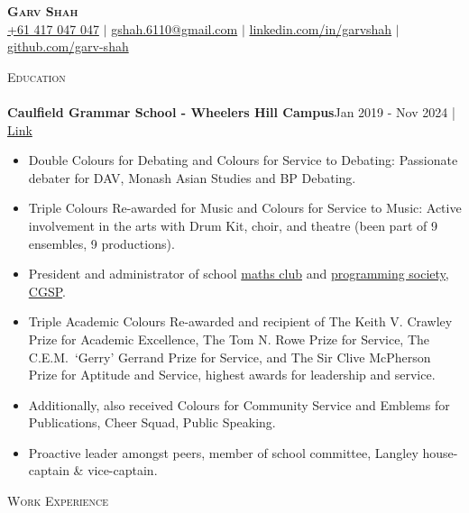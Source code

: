 \documentclass[a4paper]{article}
\newcommand{\lineunder} {
    \vspace*{-8pt} \\
    \hspace*{-18pt} \hrulefill \\
}
\newcommand{\header} [1] {
    {\hspace*{-18pt}\vspace*{6pt} \textsc{#1}}
    \vspace*{-6pt} \lineunder
}
\begin{document}
\vspace*{-40pt}



\vspace*{-20pt}

\begin{center}
    \textbf{\Huge \scshape Garv Shah} \\ \vspace{1pt}
    \small \href{tel:+61417047047}{+61 417 047 047} $|$ \href{mailto:gshah.6110@gmail.com}{gshah.6110@gmail.com} $|$
    \href{https://www.linkedin.com/in/garvshah/}{linkedin.com/in/garvshah} $|$
    \href{https://garv-shah.github.io/}{github.com/garv-shah}
\end{center}
\vspace{-2mm}

\header{Education}
\textbf{Caulfield Grammar School - Wheelers Hill Campus}\hfill Jan 2019 - Nov 2024 | \href{https://www.caulfieldgs.vic.edu.au/wheelers-hill/}{\color{blue}Link}\\
\begin{itemize} \itemsep 1pt
	\item Double Colours for Debating and Colours for Service to Debating: Passionate debater for DAV, Monash Asian Studies and BP Debating.
        \item Triple Colours Re-awarded for Music and Colours for Service to Music: Active involvement in the arts with Drum Kit, choir, and theatre (been part of 9 ensembles, 9 productions).
        \item President and administrator of school \href{https://cgs-math.github.io/}{maths club} and \href{https://cgs-programming.github.io}{programming society, CGSP}.
        \item Triple Academic Colours Re-awarded and recipient of The Keith V. Crawley Prize for Academic Excellence, The Tom N. Rowe Prize for Service, The C.E.M.\ ‘Gerry’ Gerrand Prize for Service, and The Sir Clive McPherson Prize for Aptitude and Service, highest awards for leadership and service.
        \item Additionally, also received Colours for Community Service and Emblems for Publications, Cheer Squad, Public Speaking.
        \item Proactive leader amongst peers, member of school committee, Langley house-captain \& vice-captain.
\end{itemize}

\header{Work Experience}
\vspace{1mm}
\end{document}
